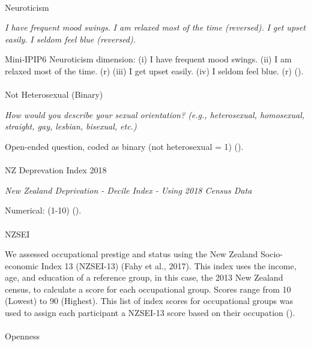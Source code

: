 \documentclass[
  single column]{article}
\makeatletter
\let\oldparagraph\paragraph
\renewcommand{\paragraph}{
    \@ifstar
      \xxxParagraphStar
      \xxxParagraphNoStar
  }
\newcommand{\xxxParagraphStar}[1]{\oldparagraph*{#1}\mbox{}}
\newcommand{\xxxParagraphNoStar}[1]{\oldparagraph{#1}\mbox{}}
\makeatother
\begin{document}
\paragraph{Neuroticism}\label{neuroticism}

\emph{I have frequent mood swings.} \emph{I am relaxed most of the time
(reversed).} \emph{I get upset easily.} \emph{I seldom feel blue
(reversed).}

Mini-IPIP6 Neuroticism dimension: (i) I have frequent mood swings. (ii)
I am relaxed most of the time. (r) (iii) I get upset easily. (iv) I
seldom feel blue. (r) ().

\paragraph{Not Heterosexual (Binary)}\label{not-heterosexual-binary}

\emph{How would you describe your sexual orientation? (e.g.,
heterosexual, homosexual, straight, gay, lesbian, bisexual, etc.)}

Open-ended question, coded as binary (not heterosexual = 1)
().

\paragraph{NZ Deprevation Index 2018}\label{nz-deprevation-index-2018}

\emph{New Zealand Deprivation - Decile Index - Using 2018 Census Data}

Numerical: (1-10) ().

\paragraph{NZSEI}\label{nzsei}

We assessed occupational prestige and status using the New Zealand
Socio-economic Index 13 (NZSEI-13) (Fahy et al., 2017). This index uses
the income, age, and education of a reference group, in this case, the
2013 New Zealand census, to calculate a score for each occupational
group. Scores range from 10 (Lowest) to 90 (Highest). This list of index
scores for occupational groups was used to assign each participant a
NZSEI-13 score based on their occupation ().

\paragraph{Openness}\label{openness}
\end{document}
